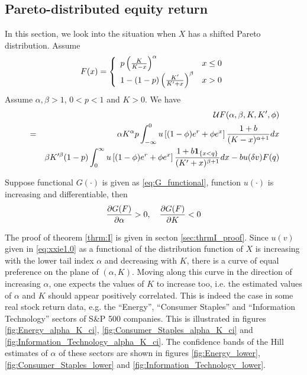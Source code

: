 \documentclass{article}
\begin{document}
\subsection{Pareto-distributed equity return}
In this section, we look into the situation when $X$ has a shifted
Pareto distribution. Assume
\begin{equation}
  \label{eq:X_distr}
  F(x) = \left\{
  \begin{array}{ll}
    p \left(
    {K \over K - x}
    \right)^\alpha & x \leq 0 \\
    1 - (1 - p) \left(
    {K' \over K' + x}
    \right)^\beta & x > 0
  \end{array}
  \right.
\end{equation}
Assume $\alpha, \beta > 1$, $0 < p < 1$ and $K > 0$.
We have
\begin{eqnarray}
  && \mathcal U F (\alpha, \beta, K, K', \phi) \nonumber \\
  &=&
  \alpha K^\alpha  p
  \int_{-\infty}^0
  u\left[ (1 - \phi) e^r + \phi e^x \right]
  {1 + b \over (K - x)^{\alpha + 1}} dx
  \nonumber \\
  &&
  \beta K'^\beta (1 - p)
  \int_{0}^\infty
  u\left[ (1 - \phi) e^r + \phi e^x \right]
  {1 + b  \mathbf{1}_{\{x < q\}}  \over (K' + x)^{\beta + 1}} dx 
  - b u(\delta v) F(q)
  \label{eq:xxie1.0}
\end{eqnarray}
\begin{theorem}
  \label{thrm:I}
  Suppose functional $G(\cdot)$ is given as \eqref{eq:G_functional},
  function $u(\cdot)$ is increasing and differentiable, then
  \[
  \frac{\partial G(F)}{\partial \alpha} > 0,
  \quad
  \frac{\partial G(F)}{\partial K} < 0
  \]
\end{theorem}
The proof of theorem \ref{thrm:I} is given in secton
\ref{sec:thrmI_proof}.
Since $u(v)$ given in \eqref{eq:xxie1.0} as a
functional of the distribution function of $X$ is increasing with the
lower tail index $\alpha$ and decreasing with $K$, there is a curve of
equal preference on the plane of $(\alpha, K)$. Moving along this
curve in the direction of increasing $\alpha$, one expects the values
of $K$ to increase too, i.e. the estimated values of $\alpha$ and $K$
should appear positively correlated. This is indeed the case in some
real stock return data, e.g. the ``Energy'', ``Consumer Staples'' and
``Information Technology'' sectors of S\&P 500 companies. This is
illustrated in figures 
\ref{fig:Energy_alpha_K_ci}, \ref{fig:Consumer_Staples_alpha_K_ci}
and \ref{fig:Information_Technology_alpha_K_ci}.
The confidence bands of the Hill estimates of $\alpha$ of these
sectors are shown in figures \ref{fig:Energy_lower},
\ref{fig:Consumer_Staples_lower} and
\ref{fig:Information_Technology_lower}.
\end{document}
